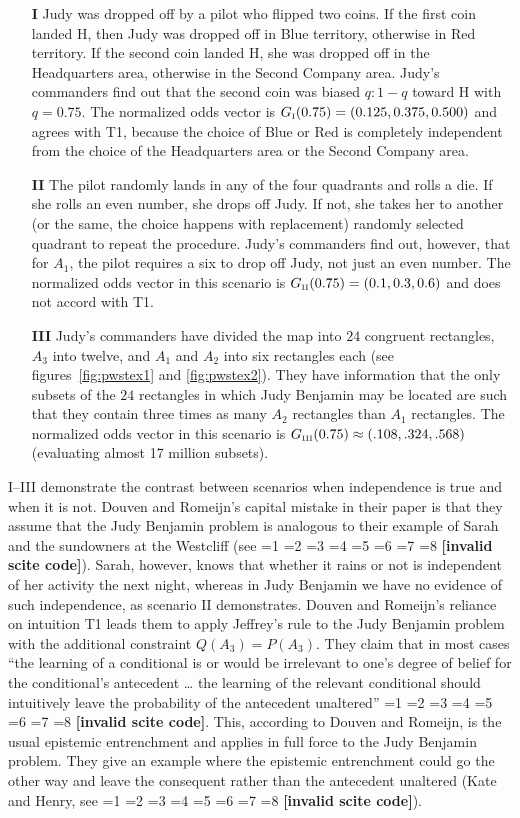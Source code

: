 \documentclass[12pt]{article}
\newcommand{\qeins}[1]{``#1''}
\newif\ifNumericalOrYear
\newcommand{\PageP}{p.~}
\newcommand{\PageP}{}
\newcommand{\scite}[3]{\ifnum#1=1\ifNumericalOrYear\citep{#2}\else\citeyearpar{#2}\fi\else
\ifnum#1=2\ifNumericalOrYear\citep[#3]{#2}\else\citep[{\PageP}#3]{#2}\fi\else
\ifnum#1=3\ifNumericalOrYear(\citet[#3]{#2})\else\citep[{\PageP}#3]{#2}\fi\else
\ifnum#1=4\ifNumericalOrYear\citet{#2}\else\citet{#2}\fi\else
\ifnum#1=5\ifNumericalOrYear(\citet{#2})\else\citep{#2}\fi\else
\ifnum#1=6\ifNumericalOrYear(\citet[#3]{#2})\else\citep[{\PageP}#3]{#2}\fi\else
\ifnum#1=7\ifNumericalOrYear\citep{#2}\else\citealp{#2}\fi\else
\ifnum#1=8\ifNumericalOrYear\citep[#3]{#2}\else\citealp[{\PageP}#3]{#2}\fi\else
\textbf{[invalid scite code]}\fi\fi\fi\fi\fi\fi\fi\fi}
\begin{document}
\begin{enumerate}
\item[\textbf{I}] Judy was dropped off by a pilot who flipped two
  coins. If the first coin landed H, then Judy was dropped off in Blue
  territory, otherwise in Red territory. If the second coin landed H,
  she was dropped off in the Headquarters area, otherwise in the
  Second Company area. Judy's commanders find out that the second coin
  was biased $q:1-q$ toward H with $q=0.75$. The normalized odds
  vector is $G_{\mbox{\tiny I}}(0.75)=(0.125,0.375,0.500)$ and agrees with T1, because the
  choice of Blue or Red is completely independent from the choice of
  the Headquarters area or the Second Company area.
\item[\textbf{II}] The pilot randomly lands in any of the four
  quadrants and rolls a die. If she rolls an even number, she drops
  off Judy. If not, she takes her to another (or the same, the choice
  happens with replacement) randomly selected quadrant to repeat the
  procedure. Judy's commanders find out, however, that for $A_{1}$,
  the pilot requires a six to drop off Judy, not just an even number.
  The normalized odds vector in this scenario is $G_{\mbox{\tiny
      II}}(0.75)=(0.1,0.3,0.6)$ and does not accord with T1.
\item[\textbf{III}] Judy's commanders have divided the map into $24$
  congruent rectangles, $A_{3}$ into twelve, and $A_{1}$ and $A_{2}$
  into six rectangles each (see figures~\ref{fig:pwstex1} and
  \ref{fig:pwstex2}). They have information that the only subsets of
  the $24$ rectangles in which Judy Benjamin may be located are such
  that they contain three times as many $A_{2}$ rectangles than
  $A_{1}$ rectangles. The normalized odds vector in this scenario is
  $G_{\mbox{\tiny III}}(0.75)\approx(.108,.324,.568)$ (evaluating almost
  17 million subsets).
\end{enumerate}

I--III demonstrate the contrast between scenarios when independence is
true and when it is not. Douven and Romeijn's capital mistake in their
paper is that they assume that the Judy Benjamin problem is analogous
to their example of Sarah and the sundowners at the Westcliff (see
\scite{8}{douvenromeijn09}{7}). Sarah, however, knows that whether it
rains or not is independent of her activity the next night, whereas in
Judy Benjamin we have no evidence of such independence, as scenario II
demonstrates. Douven and Romeijn's reliance on intuition T1 leads them
to apply Jeffrey's rule to the Judy Benjamin problem with the
additional constraint $Q(A_{3})=P(A_{3})$. They claim that in most
cases \qeins{the learning of a conditional is or would be irrelevant
  to one's degree of belief for the conditional's antecedent {\ldots}
  the learning of the relevant conditional should intuitively leave
  the probability of the antecedent unaltered}
\scite{2}{douvenromeijn09}{9}. This, according to Douven and Romeijn,
is the usual epistemic entrenchment and applies in full force to the
Judy Benjamin problem. They give an example where the epistemic
entrenchment could go the other way and leave the consequent rather
than the antecedent unaltered (Kate and Henry, see
\scite{8}{douvenromeijn09}{13}). 
\end{document}

